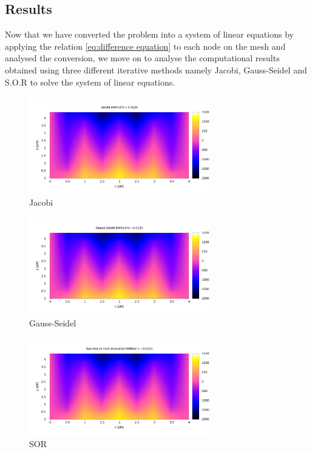 \subsection{Results}
Now that we have converted the problem into a system of linear equations by applying the relation \ref{eq:difference equation} to each node on the mesh and analysed the conversion, we move on to analyse the computational results obtained using three different iterative methods namely Jacobi, Gauss-Seidel and S.O.R to solve the system of linear equations.

\begin{figure}[H]
    \centering
    \includegraphics[width= 0.7\textwidth]{content/graphs/Jacobi_0125_map.png}
    \caption{Jacobi}
    \label{fig1}
\end{figure}%

\begin{figure}[H]
    \centering
    \includegraphics[width= 0.7\textwidth]{content/graphs/gauss_map.png}
    \caption{Gauss-Seidel}
    \label{fig2:}
\end{figure}%

\begin{figure}[H]
    \centering
    \includegraphics[width= 0.7\textwidth]{content/graphs/sor_map.png}
    \caption{SOR}
    \label{fig3:}
\end{figure}%
